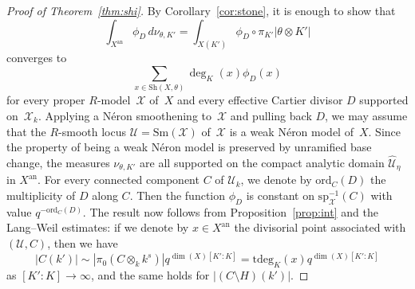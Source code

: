 \documentclass[11pt]{article}
\theoremstyle{definition}
\numberwithin{equation}{subsection}
\newcommand{\cX}{\ensuremath{\mathscr{X}}}
\newcommand{\cU}{\ensuremath{\mathscr{U}}}
\newcommand{\an}{\mathrm{an}}
\newcommand{\ord}{\mathrm{ord}}
\newcommand{\Sh}{\mathrm{Sh}}
\newcommand{\Sm}{\mathrm{Sm}}
\newcommand{\spe}{\mathrm{sp}}
\newcommand{\tdeg}{\mathrm{tdeg}}
\let\form\theta
\begin{document}
\begin{proof}[Proof of Theorem~\ref{thm:shi}]
By Corollary~\ref{cor:stone}, it is enough to show that
\[
\int_{X^{\an}}\phi_D\, d\nu_{\form,K'}=\int_{X(K')}\phi_D\circ \pi_{K'}|\form\otimes K'|
\]
converges to
\[
\sum_{x\in \Sh(X,\form)}\deg_K(x)\phi_D(x)
\]
for
every proper $R$\nobreakdash-model~$\cX$ of~$X$ and every effective Cartier divisor $D$ supported on~$\cX_k$.
Applying a Néron smoothening to~$\cX$ and pulling back $D$, we may assume that the $R$\nobreakdash-smooth locus $\cU=\Sm(\cX)$ of~$\cX$ is a weak Néron model of~$X$.
Since the property of being a weak Néron model is preserved by unramified base change, the measures $\nu_{\form,K'}$ are all supported on the compact analytic domain $\widehat{\cU}_{\eta}$ in $X^{\an}$. For every connected component $C$ of $\cU_k$, we denote by $\ord_C(D)$ the multiplicity of $D$ along $C$. Then
the function $\phi_D$ is constant on $\spe_{\cX}^{-1}(C)$ with value $q^{-\ord_C(D)}$. The result now follows from Proposition~\ref{prop:int} and the Lang--Weil estimates:
if we denote by $x\in X^{\an}$ the divisorial point associated with $(\cU,C)$, then
we have
\begin{equation*}
|C(k')|
\sim |\pi_0(C\otimes_k k^s)|q^{\dim(X)[K'\colon K]}
= \tdeg_K(x)q^{\dim(X)[K'\colon K]}
\end{equation*}
as $[K':K]\to\infty$, and the same holds for $|(C\setminus H)(k')|$.
\end{proof}
\end{document}
